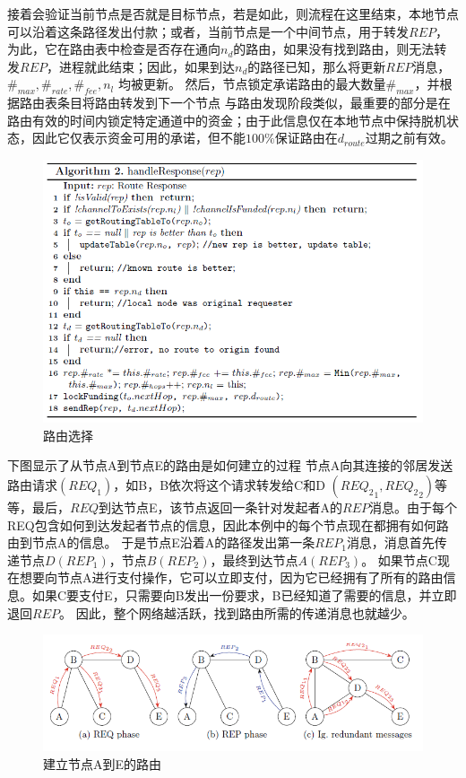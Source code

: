 \documentclass[12pt,a4paper]{article}
\begin{document}
接着会验证当前节点是否就是目标节点，若是如此，则流程在这里结束，本地节点可以沿着这条路径发出付款；或者，当前节点是一个中间节点，用于转发$REP$，为此，它在路由表中检查是否存在通向$n_d$的路由，如果没有找到路由，则无法转发$REP$，进程就此结束；因此，如果到达$n_d$的路径已知，那么将更新$REP$消息，$\#_{max},\#_{rate},\#_{fee},n_l$ 均被更新。
然后，节点锁定承诺路由的最大数量$\#_{max}$，并根据路由表条目将路由转发到下一个节点
与路由发现阶段类似，最重要的部分是在路由有效的时间内锁定特定通道中的资金；由于此信息仅在本地节点中保持脱机状态，因此它仅表示资金可用的承诺，但不能$100\%$保证路由在$d_{route}$过期之前有效。

\begin{figure}[htb]
\centering
\includegraphics[width=14cm]{select_route}
\caption{路由选择}
\end{figure}

下图显示了从节点A到节点E的路由是如何建立的过程
节点A向其连接的邻居发送路由请求$({REQ}_1)$，如B，B依次将这个请求转发给C和D $({{REQ}_2}_1, {{REQ}_2}_2)$等等，最后，$REQ$到达节点E，该节点返回一条针对发起者A的$REP$消息。由于每个REQ包含如何到达发起者节点的信息，因此本例中的每个节点现在都拥有如何路由到节点A的信息。
于是节点E沿着A的路径发出第一条${REP}_1$消息，消息首先传递节点$D({REP}_1)$，节点$B ({REP}_2)$，最终到达节点$A ({REP}_3)$。
如果节点C现在想要向节点A进行支付操作，它可以立即支付，因为它已经拥有了所有的路由信息。如果C要支付E，只需要向B发出一份要求，B已经知道了需要的信息，并立即退回$REP$。
因此，整个网络越活跃，找到路由所需的传递消息也就越少。

\begin{figure}[htb]
\centering
\includegraphics[width=14cm]{create_route}
\caption{\label{create_route} 建立节点A到E的路由}
\end{figure}
\end{document}
